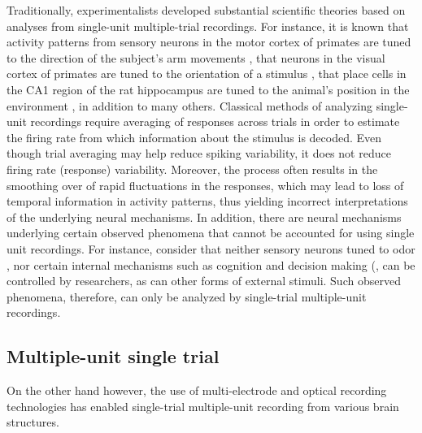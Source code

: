 Traditionally, experimentalists developed substantial scientific theories based on analyses from single-unit multiple-trial recordings. For instance, it is known that activity patterns from sensory neurons in the motor cortex of primates are tuned to the direction of the subject's arm movements \cite{Georgopoulos1982}, that neurons in the visual cortex of primates are tuned to the orientation of a stimulus \cite{Hubel1968}, that place cells in the CA1 region of the rat hippocampus are tuned to the animal's position in the environment \cite{OKeefe1971}, in addition to many others.
Classical  methods of analyzing single-unit recordings require averaging of responses across trials in order to estimate the firing rate from which information about the stimulus is decoded. Even though trial averaging may help reduce spiking variability, it does not reduce firing rate (response) variability.
Moreover, the process often results in the smoothing over of rapid fluctuations in the 
responses, which may lead to loss of temporal information in activity patterns, thus yielding incorrect interpretations of the underlying neural mechanisms.
In addition, there are neural mechanisms underlying certain observed phenomena 
that cannot be accounted for using single unit recordings.
For instance, consider that neither sensory neurons tuned to odor \cite{Hopfield1995},
nor certain internal mechanisms such as cognition and decision making (\cite{Redish2016,
Vos2015, Kaufman2014, Mazor2005}, can be controlled by researchers, as can other forms of external stimuli. Such observed phenomena, therefore, can only be analyzed by single-trial multiple-unit recordings. 




\subsection{Multiple-unit single trial}

On the other hand however, the use of multi-electrode \cite{Kipke2008} and optical \cite{Kerr2008} recording technologies
has enabled single-trial multiple-unit recording from various brain structures.\\

